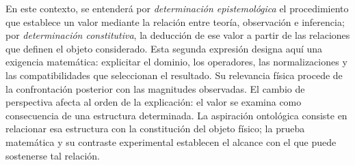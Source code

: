 En este contexto, se entenderá por \emph{determinación epistemológica}
el procedimiento que establece un valor mediante la relación entre teoría,
observación e inferencia; por \emph{determinación constitutiva}, la
deducción de ese valor a partir de las relaciones que definen el objeto
considerado. Esta segunda expresión designa aquí una exigencia matemática:
explicitar el dominio, los operadores, las normalizaciones y las
compatibilidades que seleccionan el resultado. Su relevancia física
procede de la confrontación posterior con las magnitudes observadas.
El cambio de perspectiva afecta al orden de la explicación: el valor se
examina como consecuencia de una estructura determinada. La aspiración
ontológica consiste en relacionar esa estructura con la constitución del
objeto físico; la prueba matemática y su contraste experimental establecen
el alcance con el que puede sostenerse tal relación.

